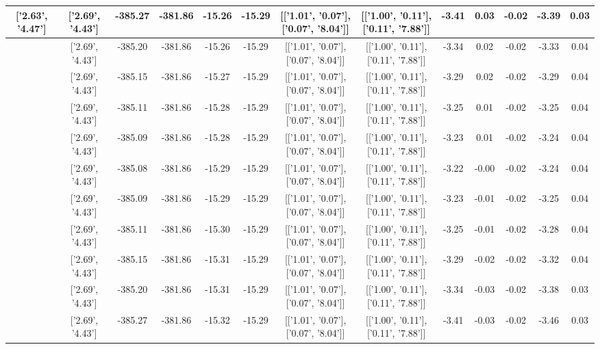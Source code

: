 \begin{table}[htbp]
\begin{adjustbox}{angle=90}
\begin{tabular}{|c|c|c|c|c|c|c|c|c|c|c|c|c|}
 ['2.63', '4.47'] & ['2.69', '4.43'] & -385.27 & -381.86 & -15.26 & -15.29 & [['1.01', '0.07'], ['0.07', '8.04']] & [['1.00', '0.11'], ['0.11', '7.88']] & -3.41 & 0.03 & -0.02 & -3.39 & 0.03\\ \hline
 ['2.64', '4.46'] & ['2.69', '4.43'] & -385.20 & -381.86 & -15.26 & -15.29 & [['1.01', '0.07'], ['0.07', '8.04']] & [['1.00', '0.11'], ['0.11', '7.88']] & -3.34 & 0.02 & -0.02 & -3.33 & 0.04\\ \hline
 ['2.65', '4.45'] & ['2.69', '4.43'] & -385.15 & -381.86 & -15.27 & -15.29 & [['1.01', '0.07'], ['0.07', '8.04']] & [['1.00', '0.11'], ['0.11', '7.88']] & -3.29 & 0.02 & -0.02 & -3.29 & 0.04\\ \hline
 ['2.66', '4.45'] & ['2.69', '4.43'] & -385.11 & -381.86 & -15.28 & -15.29 & [['1.01', '0.07'], ['0.07', '8.04']] & [['1.00', '0.11'], ['0.11', '7.88']] & -3.25 & 0.01 & -0.02 & -3.25 & 0.04\\ \hline
 ['2.68', '4.44'] & ['2.69', '4.43'] & -385.09 & -381.86 & -15.28 & -15.29 & [['1.01', '0.07'], ['0.07', '8.04']] & [['1.00', '0.11'], ['0.11', '7.88']] & -3.23 & 0.01 & -0.02 & -3.24 & 0.04\\ \hline
 ['2.69', '4.43'] & ['2.69', '4.43'] & -385.08 & -381.86 & -15.29 & -15.29 & [['1.01', '0.07'], ['0.07', '8.04']] & [['1.00', '0.11'], ['0.11', '7.88']] & -3.22 & -0.00 & -0.02 & -3.24 & 0.04\\ \hline
 ['2.70', '4.43'] & ['2.69', '4.43'] & -385.09 & -381.86 & -15.29 & -15.29 & [['1.01', '0.07'], ['0.07', '8.04']] & [['1.00', '0.11'], ['0.11', '7.88']] & -3.23 & -0.01 & -0.02 & -3.25 & 0.04\\ \hline
 ['2.72', '4.42'] & ['2.69', '4.43'] & -385.11 & -381.86 & -15.30 & -15.29 & [['1.01', '0.07'], ['0.07', '8.04']] & [['1.00', '0.11'], ['0.11', '7.88']] & -3.25 & -0.01 & -0.02 & -3.28 & 0.04\\ \hline
 ['2.73', '4.42'] & ['2.69', '4.43'] & -385.15 & -381.86 & -15.31 & -15.29 & [['1.01', '0.07'], ['0.07', '8.04']] & [['1.00', '0.11'], ['0.11', '7.88']] & -3.29 & -0.02 & -0.02 & -3.32 & 0.04\\ \hline
 ['2.74', '4.41'] & ['2.69', '4.43'] & -385.20 & -381.86 & -15.31 & -15.29 & [['1.01', '0.07'], ['0.07', '8.04']] & [['1.00', '0.11'], ['0.11', '7.88']] & -3.34 & -0.03 & -0.02 & -3.38 & 0.03\\ \hline
 ['2.75', '4.40'] & ['2.69', '4.43'] & -385.27 & -381.86 & -15.32 & -15.29 & [['1.01', '0.07'], ['0.07', '8.04']] & [['1.00', '0.11'], ['0.11', '7.88']] & -3.41 & -0.03 & -0.02 & -3.46 & 0.03\\ \hline

\end{tabular}
\end{adjustbox}
\end{table}
